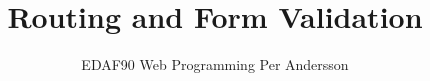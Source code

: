 \documentclass[aspectratio=1610]{beamer}
\title[routing and form validation]{Routing and Form Validation}
\author[EDAF90]{%
  EDAF90 Web Programming\newline
  Per Andersson}
\begin{document}
\begin{frame}[plain]%
  \titlepage
\end{frame}






\end{document}
